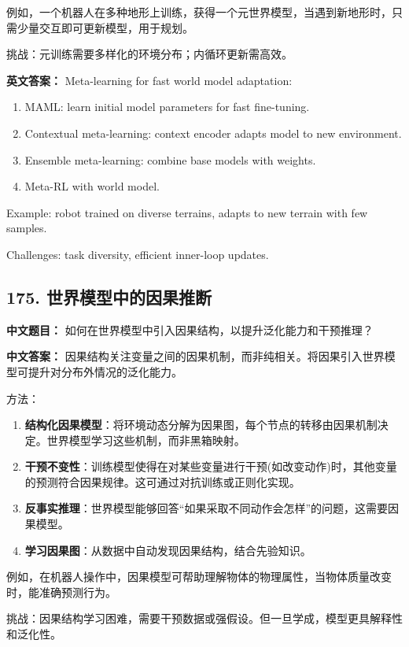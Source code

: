 \documentclass[10pt,a4paper]{ctexart}
\begin{document}
例如，一个机器人在多种地形上训练，获得一个元世界模型，当遇到新地形时，只需少量交互即可更新模型，用于规划。

挑战：元训练需要多样化的环境分布；内循环更新需高效。

\textbf{英文答案：}  
Meta-learning for fast world model adaptation:

\begin{enumerate}
    \item MAML: learn initial model parameters for fast fine-tuning.
    \item Contextual meta-learning: context encoder adapts model to new environment.
    \item Ensemble meta-learning: combine base models with weights.
    \item Meta-RL with world model.
\end{enumerate}

Example: robot trained on diverse terrains, adapts to new terrain with few samples.

Challenges: task diversity, efficient inner-loop updates.

\subsection*{175. 世界模型中的因果推断}
\textbf{中文题目：} 如何在世界模型中引入因果结构，以提升泛化能力和干预推理？

\textbf{中文答案：}  
因果结构关注变量之间的因果机制，而非纯相关。将因果引入世界模型可提升对分布外情况的泛化能力。

方法：
\begin{enumerate}
    \item \textbf{结构化因果模型}：将环境动态分解为因果图，每个节点的转移由因果机制决定。世界模型学习这些机制，而非黑箱映射。
    \item \textbf{干预不变性}：训练模型使得在对某些变量进行干预(如改变动作)时，其他变量的预测符合因果规律。这可通过对抗训练或正则化实现。
    \item \textbf{反事实推理}：世界模型能够回答“如果采取不同动作会怎样”的问题，这需要因果模型。
    \item \textbf{学习因果图}：从数据中自动发现因果结构，结合先验知识。
\end{enumerate}

例如，在机器人操作中，因果模型可帮助理解物体的物理属性，当物体质量改变时，能准确预测行为。

挑战：因果结构学习困难，需要干预数据或强假设。但一旦学成，模型更具解释性和泛化性。
\end{document}
